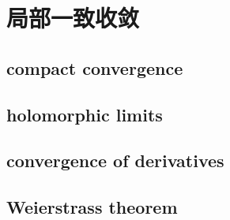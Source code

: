 \section{局部一致收敛}
\label{b3:sec:0401}


\subsection{compact convergence}
\label{b3:subsec:040101}

\subsection{holomorphic limits}
\label{b3:subsec:040102}

\subsection{convergence of derivatives}
\label{b3:subsec:040103}

\subsection{Weierstrass theorem}
\label{b3:subsec:040104}


